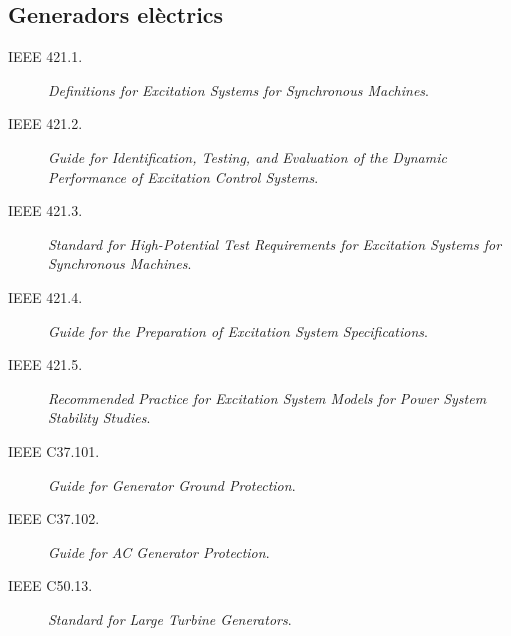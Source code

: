 \subsection*{Generadors elèctrics}
\begin{description}
    \item [\hspace{5mm}IEEE 421.1.] \textit{Definitions for Excitation Systems for Synchronous Machines}.
    \item [\hspace{5mm}IEEE 421.2.] \textit{Guide for Identification, Testing, and Evaluation of the Dynamic Performance of Excitation Control Systems}.
    \item [\hspace{5mm}IEEE 421.3.] \textit{Standard for High-Potential Test Requirements for Excitation Systems for Synchronous Machines}.
    \item [\hspace{5mm}IEEE 421.4.] \textit{Guide for the Preparation of Excitation System Specifications}.
    \item [\hspace{5mm}IEEE 421.5.] \textit{Recommended Practice for Excitation System Models for Power System Stability Studies}.
    \item [\hspace{5mm}IEEE C37.101.] \textit{Guide for Generator Ground Protection}.
    \item [\hspace{5mm}IEEE C37.102.] \textit{Guide for AC Generator Protection}.
    \item [\hspace{5mm}IEEE C50.13.] \textit{Standard for Large Turbine Generators}.
\end{description}


